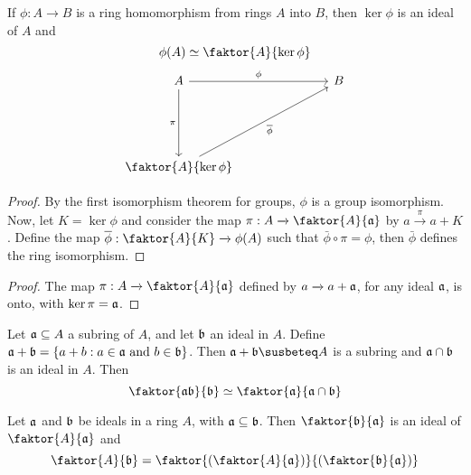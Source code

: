 \begin{theorem}\label{1.3.4}
    If $\phi:A \xrightarrow{} B$ is a ring homomorphism from rings $A$ into $B$,
    then $\ker{\phi}$ is an ideal of $A$ and
    \begin{equation*}
        \phi(A) \simeq \faktor{A}{\ker{\phi}}
    \end{equation*}
    \[\begin{tikzcd}
        A &&& B \\
        \\
        \\
        {\faktor{A}{\ker{\phi}}}
        \arrow["\pi"', from=1-1, to=4-1]
        \arrow["\phi", from=1-1, to=1-4]
        \arrow["{\bar{\phi}}"', from=4-1, to=1-4]
    \end{tikzcd}\]
\end{theorem}
\begin{proof}
    By the first isomorphism theorem for groups, $\phi$ is a group isomorphism.
    Now, let $K=\ker{\phi}$ and consider the map $\pi:A \xrightarrow{}
    \faktor{A}{\af}$ by $a \xrightarrow{\pi} a+K$. Define the map
    $\bar{\phi}:\faktor{A}{K} \xrightarrow{} \phi(A)$ such that $\bar{\phi}
    \circ \pi=\phi$, then $\bar{\phi}$ defines the ring isomorphism.
\end{proof}
\begin{proof}
    The map $\pi:A \xrightarrow{} \faktor{A}{\af}$ defined by $a \xrightarrow{}
    a+\af$, for any ideal $\af$, is onto, with $\ker{\pi}=\af$.
\end{proof}

\begin{theorem}\label{1.3.5}
    Let $\af \subseteq A$ a subring of  $A$, and let $\bf$ an ideal in $A$. Define
     $\af+\bf=\{a+b : a \in \af \text{ and } b \in \bf\}$. Then
     $\af+\bf \susbeteq A$ is a subring and  $\af \cap \bf$ is an ideal in $A$.
     Then
     \begin{equation*}
         \faktor{\af\bf}{\bf} \simeq \faktor{\af}{\af \cap \bf}
     \end{equation*}
\end{theorem}

\begin{theorem}\label{1.3.6}
    Let $\af$ and  $\bf$ be ideals in a ring  $A$, with  $\af \subseteq \bf$. Then
    $\faktor{\bf}{\af}$ is an ideal of $\faktor{A}{\af}$ and
    \begin{equation*}
        \faktor{A}{\bf}=\faktor{(\faktor{A}{\af})}{(\faktor{\bf}{\af})}
    \end{equation*}
\end{theorem}


